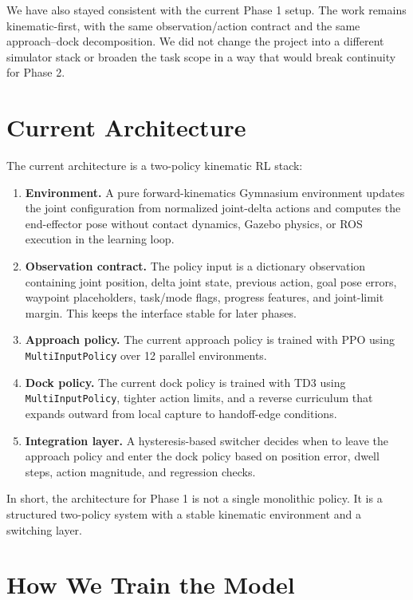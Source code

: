 \documentclass[11pt]{article}
\begin{document}
We have also stayed consistent with the current Phase 1 setup. The work remains kinematic-first, with the same observation/action contract and the same approach--dock decomposition. We did not change the project into a different simulator stack or broaden the task scope in a way that would break continuity for Phase 2.

\section{Current Architecture}

The current architecture is a two-policy kinematic RL stack:
\begin{enumerate}[leftmargin=1.5em]
  \item \textbf{Environment.} A pure forward-kinematics Gymnasium environment updates the joint configuration from normalized joint-delta actions and computes the end-effector pose without contact dynamics, Gazebo physics, or ROS execution in the learning loop.
  \item \textbf{Observation contract.} The policy input is a dictionary observation containing joint position, delta joint state, previous action, goal pose errors, waypoint placeholders, task/mode flags, progress features, and joint-limit margin. This keeps the interface stable for later phases.
  \item \textbf{Approach policy.} The current approach policy is trained with PPO using \texttt{MultiInputPolicy} over 12 parallel environments.
  \item \textbf{Dock policy.} The current dock policy is trained with TD3 using \texttt{MultiInputPolicy}, tighter action limits, and a reverse curriculum that expands outward from local capture to handoff-edge conditions.
  \item \textbf{Integration layer.} A hysteresis-based switcher decides when to leave the approach policy and enter the dock policy based on position error, dwell steps, action magnitude, and regression checks.
\end{enumerate}

In short, the architecture for Phase 1 is not a single monolithic policy. It is a structured two-policy system with a stable kinematic environment and a switching layer.

\section{How We Train the Model}
\end{document}
